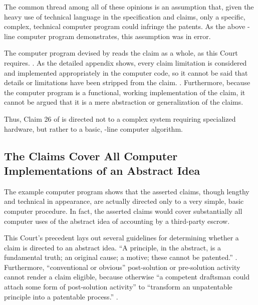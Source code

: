 \documentclass{scotus}
\begin{document}
The common thread among all of these opinions is an assumption that, given the
heavy use of technical language in the specification and claims, only a
specific, complex, technical computer program could infringe the patents. As the
above \numlines-line computer program demonstrates, this assumption was in
error.

The computer program devised by \amici reads
the claim as a whole, as this Court requires. . As
the detailed appendix shows, every
claim limitation is considered and implemented appropriately in the
computer code, so it cannot be said that details or limitations have been
stripped from the claim. . Furthermore,
because
the computer program is a functional, working implementation of the claim, it
cannot be argued that it is a mere abstraction or generalization of the claims.

Thus, Claim 26 of  is directed not to a complex
system requiring specialized hardware, but rather to a basic,
\numlines-line computer algorithm.


%
%
\subsection{The Claims Cover All
Computer Implementations of an Abstract Idea}

The example computer program shows that the asserted claims, though lengthy and
technical in appearance, are actually directed only to a very simple, basic
computer procedure.
In fact, the asserted claims would cover substantially all computer uses of
the abstract idea of accounting by a third-party escrow.

This Court's precedent lays out several guidelines for determining whether a
claim is directed to an abstract idea.
``A principle, in the abstract, is a fundamental truth; an original cause; a
motive; these cannot be patented.''
.
Furthermore, ``conventional or
obvious''
post-solution or pre-solution activity cannot
render a claim eligible, because otherwise
``a competent draftsman could attach some form of post-solution activity'' to
``transform an unpatentable principle into a patentable process.''
.
\end{document}
